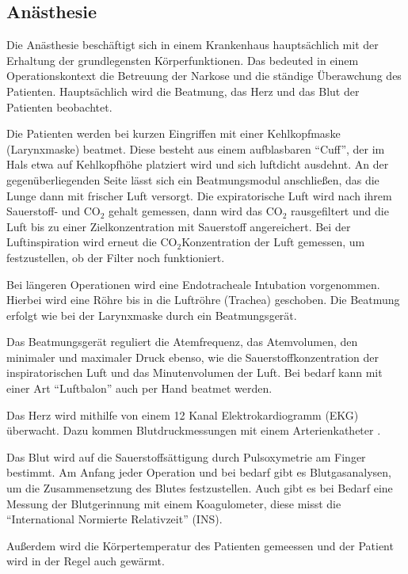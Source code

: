 \documentclass[11pt,a4paper,titlepage]{scrartcl}
\begin{document}
\subsection{Anästhesie}

Die Anästhesie beschäftigt sich in einem Krankenhaus hauptsächlich mit der Erhaltung der grundlegensten Körperfunktionen. Das bedeuted in einem Operationskontext die Betreuung der Narkose und die ständige Überawchung des Patienten. Hauptsächlich wird die Beatmung, das Herz und das Blut der Patienten beobachtet. \medskip

Die Patienten werden bei kurzen Eingriffen mit einer Kehlkopfmaske (Larynxmaske) beatmet. Diese besteht aus einem aufblasbaren \enquote{Cuff}, der im Hals etwa auf Kehlkopfhöhe platziert wird und sich luftdicht ausdehnt. An der gegenüberliegenden Seite lässt sich ein Beatmungsmodul anschließen, das die Lunge dann mit frischer Luft versorgt. Die expiratorische Luft wird nach ihrem Sauerstoff- und CO$_{2}$ gehalt gemessen, dann wird das CO$_{2}$ rausgefiltert und die Luft bis zu einer Zielkonzentration mit Sauerstoff angereichert. Bei der Luftinspiration wird erneut die CO$_{2}$Konzentration der Luft gemessen, um festzustellen, ob der Filter noch funktioniert. \medskip

Bei längeren Operationen wird eine Endotracheale Intubation vorgenommen. Hierbei wird eine Röhre bis in die Luftröhre (Trachea) geschoben. Die Beatmung erfolgt wie bei der Larynxmaske durch ein Beatmungsgerät. \medskip

Das Beatmungsgerät reguliert die Atemfrequenz, das Atemvolumen, den minimaler und maximaler Druck ebenso, wie die Sauerstoffkonzentration der inspiratorischen Luft und das Minutenvolumen der Luft. Bei bedarf kann mit einer Art \enquote{Luftbalon} auch per Hand beatmet werden. \medskip

Das Herz wird mithilfe von einem 12 Kanal Elektrokardiogramm (EKG) überwacht. Dazu kommen Blutdruckmessungen mit einem Arterienkatheter . \medskip

Das Blut wird auf die Sauerstoffsättigung durch Pulsoxymetrie am Finger bestimmt. Am Anfang jeder Operation und bei bedarf gibt es Blutgasanalysen, um die Zusammensetzung des Blutes festzustellen. Auch gibt es bei Bedarf eine Messung der Blutgerinnung mit einem Koagulometer, diese misst die \enquote{International Normierte Relativzeit} (INS).\medskip

Außerdem wird die Körpertemperatur des Patienten gemeessen und der Patient wird in der Regel auch gewärmt. \medskip
\end{document}
